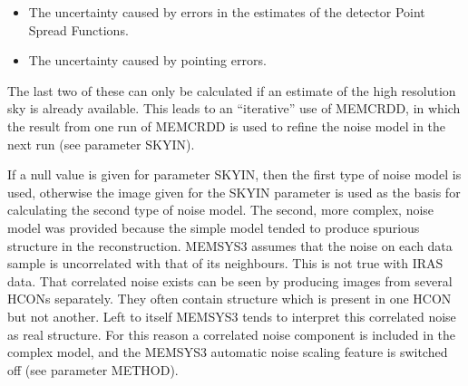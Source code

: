 \begin{enumerate}
\begin {itemize}
The correlated noise is estimated as follows:
\begin{itemize}

\item A low resolution image is formed from all the input scans using a simple 
co-addition algorithm. Features which are not present in all scans will be 
attenuated in this image due to the averaging process.

\item A set of low resolution images are formed in which each image contains 
data from only one scan. 

\item A set of images containing the squared residuals between each single-scan
image and the all-scan image are formed. These residuals will be high for
features which are present in the single-scan image but which are attenuated in
the all-scan image. 

\item The OPUS routine is applied to each residual image to create something 
which looks like a simulated data set, but in which each sample is actually
an estimate of the mean variance between the single-scan image and the 
all-scan image over the area of the corresponding data sample.

\end{itemize}

\item The uncertainty caused by errors in the estimates of the detector Point 
Spread Functions.
\item The uncertainty caused by pointing errors.
\end{itemize}
The last two of these can only be calculated if an estimate of the high 
resolution sky is already available. This leads to an ``iterative'' use of 
MEMCRDD, in which the result from one run of MEMCRDD is used to refine the noise 
model in the next run (see parameter SKYIN).

\end{enumerate}

If a null value is given for parameter SKYIN, then the first type of noise
model is  used, otherwise the image given for the SKYIN parameter is used as
the basis for  calculating the second type of noise model. The second, more
complex, noise  model was provided because the simple model tended to produce
spurious structure  in the reconstruction. MEMSYS3 assumes that the noise on
each data sample is  uncorrelated with that of its neighbours. This is not true
with IRAS data.  That correlated noise exists can be seen by producing images
from several HCONs separately. They often contain structure which is present in
one HCON but not  another. Left to itself MEMSYS3 tends to interpret this
correlated noise as  real structure. For this reason a correlated noise
component is included in the  complex model, and the MEMSYS3 automatic noise
scaling feature is switched  off (see parameter METHOD).

